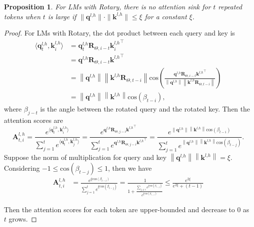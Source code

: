 \documentclass{article} \usepackage{iclr2025_conference,times}
\newtheorem{proposition}{Proposition}
\begin{document}
\begin{proposition}\label{prop4}
    For LMs with Rotary, there is no attention sink for $t$ repeated tokens when $t$ is large if $\|\boldsymbol{q}^{l\textrm{,}h}\|\cdot\|\boldsymbol{k}^{l\textrm{,}h}\|\leq \xi$ for a constant $\xi$.
\end{proposition}
\begin{proof}
    For LMs with Rotary, the dot product between each query and key is 
\begin{align}
\langle\boldsymbol{q}_t^{l\textrm{,}h}\textrm{,}\,\boldsymbol{k}_i^{l\textrm{,}h}\rangle&=\boldsymbol{q}_t^{l\textrm{,}h}\boldsymbol{R}_{\Theta\textrm{,}\,i-t}{\boldsymbol{k}_i^{l\textrm{,}h}}^\top\\
&=\boldsymbol{q}^{l\textrm{,}h}\boldsymbol{R}_{\Theta\textrm{,}\,i-t}{\boldsymbol{k}^{l\textrm{,}h}}^\top\\
&=\left\|\boldsymbol{q}^{l\textrm{,}h}\right\|\left\|\boldsymbol{k}^{l\textrm{,}h}\boldsymbol{R}_{\Theta\textrm{,}\,t-i}\right\|\textrm{cos}\left(\frac{\boldsymbol{q}^{l\textrm{,}h}\boldsymbol{R}_{\Theta\textrm{,}\,i-t}{\boldsymbol{k}^{l\textrm{,}h}}^\top}{\left\|\boldsymbol{q}^{l\textrm{,}h}\right\|\left\|\boldsymbol{k}^{l\textrm{,}h}\boldsymbol{R}_{\Theta\textrm{,}\,t-i}\right\|}\right)\\
&=\left\|\boldsymbol{q}^{l\textrm{,}h}\right\|\left\|\boldsymbol{k}^{l\textrm{,}h}\right\|\textrm{cos}(\beta_{t-i})\textrm{,}
\end{align}
where $\beta_{j-t}$ is the angle between the rotated query and the rotated key. Then the attention scores are
\begin{equation}
\boldsymbol{A}_{t\textrm{,}\,i}^{l\textrm{,}\,h}=\frac{e^{\langle\boldsymbol{q}_t^{l\textrm{,}h}\textrm{,}\,\boldsymbol{k}_i^{l\textrm{,}h}\rangle}}{\sum_{j=1}^t e^{\langle\boldsymbol{q}_t^{l\textrm{,}h}\textrm{,}\,\boldsymbol{k}_j^{l\textrm{,}h}\rangle}}=\frac{e^{\boldsymbol{q}^{l\textrm{,}h}\boldsymbol{R}_{\Theta\textrm{,}\,j-i}{\boldsymbol{k}^{l\textrm{,}h}}^\top}}{\sum_{j=1}^te^{\boldsymbol{q}^{l\textrm{,}h}\boldsymbol{R}_{\Theta\textrm{,}\,j-i}{\boldsymbol{k}^{l\textrm{,}h}}^\top}}=\frac{e^{\left\|\boldsymbol{q}^{l\textrm{,}h}\right\|\left\|\boldsymbol{k}^{l\textrm{,}h}\right\|\textrm{cos}(\beta_{t-i})}}{\sum_{j=1}^te^{\left\|\boldsymbol{q}^{l\textrm{,}h}\right\|\left\|\boldsymbol{k}^{l\textrm{,}h}\right\|\textrm{cos}(\beta_{t-j})}}\textrm{.}
\end{equation}
Suppose the norm of multiplication for query and key  $\left\|\boldsymbol{q}^{l\textrm{,}h}\right\|\left\|\boldsymbol{k}^{l\textrm{,}h}\right\|=\xi$. Considering $-1\leq\textrm{cos}(\beta_{t-j})\leq 1$, then we have
\begin{align}
\boldsymbol{A}_{t\textrm{,}\,i}^{l\textrm{,}\,h}&=\frac{e^{\xi\textrm{cos}(\beta_{t-i})}}{\sum_{j=1}^te^{\xi\textrm{cos}(\beta_{t-j})}}
=\frac{1}{1+\frac{\sum_{j\neq i}e^{\xi\textrm{cos}(\beta_{t-j})}}{e^{\xi\textrm{cos}(\beta_{t-i})}}}
\leq\frac{e^{2\xi}}{e^{2\xi}+(t-1)}
\end{align}


Then the attention scores for each token are upper-bounded and decrease to $0$ as $t$ grows.
\end{proof}
\end{document}
